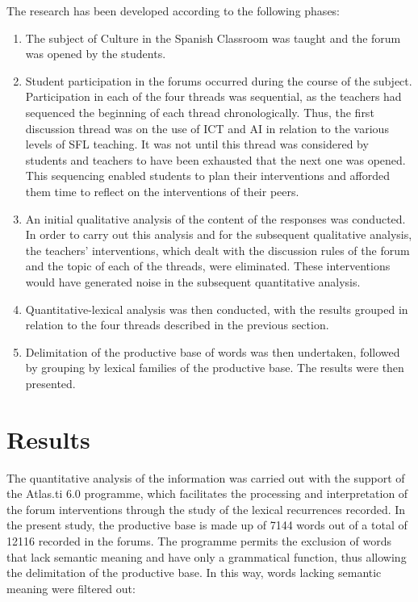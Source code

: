 \documentclass[english]{textolivre}
\begin{document}
The research has been developed according to the following phases:
\begin{enumerate}[label=\alph*)]
    \item The subject of Culture in the Spanish Classroom was taught and the forum was opened by the students.
    \item Student participation in the forums occurred during the course of the subject. Participation in each of the four threads was sequential, as the teachers had sequenced the beginning of each thread chronologically. Thus, the first discussion thread was on the use of ICT and AI in relation to the various levels of SFL teaching. It was not until this thread was considered by students and teachers to have been exhausted that the next one was opened. This sequencing enabled students to plan their interventions and afforded them time to reflect on the interventions of their peers.
    \item An initial qualitative analysis of the content of the responses \cite{caceres2023derecho} was conducted. In order to carry out this analysis and for the subsequent qualitative analysis, the teachers' interventions, which dealt with the discussion rules of the forum and the topic of each of the threads, were eliminated. These interventions would have generated noise in the subsequent quantitative analysis.
    \item Quantitative-lexical analysis was then conducted, with the results grouped in relation to the four threads described in the previous section.
    \item Delimitation of the productive base of words was then undertaken, followed by grouping by lexical families of the productive base. The results were then presented.
\end{enumerate}


\section{Results}
The quantitative analysis of the information was carried out with the support of the Atlas.ti 6.0 programme, which facilitates the processing and interpretation of the forum interventions through the study of the lexical recurrences recorded. In the present study, the productive base is made up of 7144 words out of a total of 12116 recorded in the forums. The programme permits the exclusion of words that lack semantic meaning and have only a grammatical function, thus allowing the delimitation of the productive base. In this way, words lacking semantic meaning were filtered out:
\end{document}
